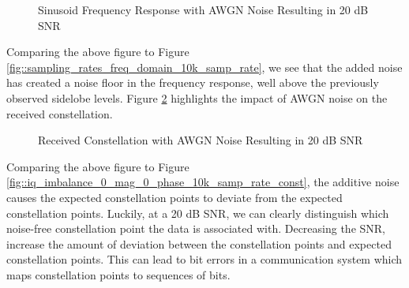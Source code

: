 \documentclass{article}
\begin{document}
\begin{figure}[H]
	\centerline{}
	\caption{Sinusoid Frequency Response with AWGN Noise Resulting in 20 dB SNR}
	\label{fig::noise_freq_domain_20dB_snr}
\end{figure}

Comparing the above figure to Figure \ref{fig::sampling_rates_freq_domain_10k_samp_rate}, we see that the added noise has created a noise floor in the frequency response, well above the previously observed sidelobe levels. Figure \ref{fig::noise_constellation_20dB_snr} highlights the impact of AWGN noise on the received constellation.

\begin{figure}[H]
	\centerline{}
	\caption{Received Constellation with AWGN Noise Resulting in 20 dB SNR}
	\label{fig::noise_constellation_20dB_snr}
\end{figure}

Comparing the above figure to Figure \ref{fig::iq_imbalance_0_mag_0_phase_10k_samp_rate_const}, the additive noise causes the expected constellation points to deviate from the expected constellation points. Luckily, at a 20 dB SNR, we can clearly distinguish which noise-free constellation point the data is associated with. Decreasing the SNR, increase the amount of deviation between the constellation points and expected constellation points. This can lead to bit errors in a communication system which maps constellation points to sequences of bits.
\end{document}
